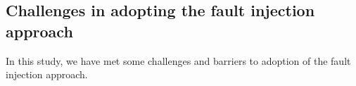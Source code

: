 \subsection{Challenges in adopting the fault injection approach}\label{sec:challenges}
In this study, we have met some challenges and barriers to adoption of the fault injection approach. 
%
%

